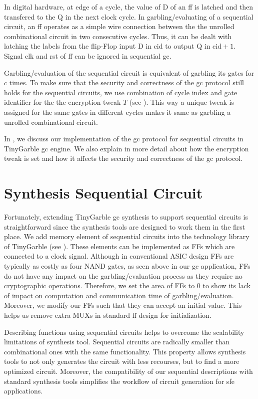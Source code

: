In digital hardware, at edge of a cycle, the value of D of an \acrshort{ff} is latched and then transfered to the Q in the next clock cycle.
In garbling/evaluating of a sequential circuit, an \acrshort{ff} operates as a simple wire connection between the the unrolled combinational circuit in two consecutive cycles.
Thus, it can be dealt with latching the labels from the flip-Flop input D in $\textrm{cid}$ to output Q in $\textrm{cid}+1$.
Signal clk and rst of \acrshort{ff} can be ignored in sequential \acrshort{gc}.

Garbling/evaluation of the sequential circuit is equivalent of garbling its gates for $c$ times.
To make sure that the security and correctness of the \acrshort{gc} protocol still holds for the sequential circuits, we use combination of cycle index and gate identifier for the the encryption tweak $T$ (see ).
This way a unique tweak is assigned for the same gates in different cycles makes it same as garbling a unrolled combinational circuit.

In , we discuss our implementation of the \acrshort{gc} protocol for sequential circuits in TinyGarble \acrshort{gc} engine.
We also explain in more detail about how the encryption tweak is set and how it affects the security and correctness of the \acrshort{gc} protocol.

\section{Synthesis Sequential Circuit}\label{sec:seq-syn}
Fortunately, extending TinyGarble \acrshort{gc} synthesis to support sequential circuits is straightforward since the synthesis tools are designed to work them in the first place.
We add memory element of sequential circuits into the technology library of TinyGarble (see ).
These elements can be implemented as FFs which are connected to a clock signal.
Although in conventional ASIC design FFs are typically as costly as four NAND gates, as seen above in our \acrshort{gc} application, FFs do not have any impact on the garbling/evaluation process as they require no cryptographic operations.
Therefore, we set the area of FFs to 0 to show its lack of impact on computation and communication time of garbling/evaluation.
Moreover, we modify our FFs such that they can accept an initial value.
This helps us remove extra MUXs in standard \acrshort{ff} design for initialization.

Describing functions using sequential circuits helps to overcome the scalability limitations of synthesis tool.
Sequential circuits are radically smaller than combinational ones with the same functionality.
This property allows synthesis tools to not only generates the circuit with less recourses, but to find a more optimized circuit.
Moreover, the compatibility of our sequential descriptions with standard synthesis tools simplifies the workflow of circuit generation for \acrshort{sfe} applications.

